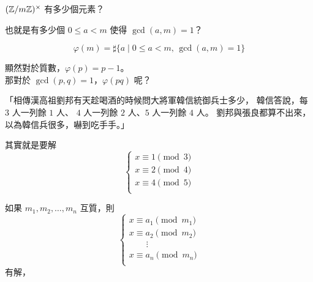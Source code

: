 \documentclass[standalone]{beamer}
\begin{document}
\begin{frame}{}
  \begin{missue}
    \centering
    $(\mathbb{Z} / m\mathbb{Z})^\times$ 有多少個元素？
  \end{missue}
  \pause \disskip

  也就是有多少個 $0 \leq a < m$ 使得 $\gcd(a, m) = 1$？ \\[\parskip]
  \pause

  \begin{definition} \vspace*{-1em}
    \[ \varphi(m) = \sharp \{ a \mid 0 \leq a < m, \, \gcd(a, m) = 1\} \]
  \end{definition}
  \pause \disskip
  顯然對於質數，$\varphi(p) = p-1$。 \\ \pause
  那對於 $\gcd(p, q) = 1$，$\varphi(p q)$ 呢？
\end{frame}

\begin{frame}{}
  「相傳漢高祖劉邦有天趁喝酒的時候問大將軍韓信統御兵士多少，
韓信答說，每 $3$ 人一列餘 $1$ 人、 $4$ 人一列餘 $2$ 人、$5$ 人一列餘 $4$ 人。
劉邦與張良都算不出來，以為韓信兵很多，嚇到吃手手。」
\pause

其實就是要解
\[
  \begin{cases}
    x \equiv 1 \pmod{3} \\
    x \equiv 2 \pmod{4} \\
    x \equiv 4 \pmod{5} \\
  \end{cases}
\]
\end{frame}

\begin{frame}{}
  \begin{theorem}[中國剩餘定理]
    如果 $m_1, m_2, \dots, m_n$ \alert<1>{互質}，則
    \[
      \begin{cases}
        x \equiv a_1 \pmod{m_1} \\
        x \equiv a_2 \pmod{m_2} \\
        \quad \quad \vdots \\
        x \equiv a_n \pmod{m_n} \\
      \end{cases}
    \]
    有解，
  \end{theorem}
\end{frame}
\end{document}
